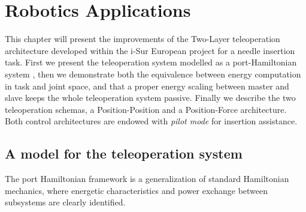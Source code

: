 \chapter{Robotics Applications}

This chapter will present the improvements of the Two-Layer teleoperation architecture developed within the i-Sur European project \cite{Ferraguti2015} for a needle insertion task.
First we present the teleoperation system modelled as a port-Hamiltonian system \cite{Ferraguti2015}, then we demonstrate both the equivalence between energy computation in task and joint space, and that a proper energy scaling between master and slave keeps the whole teleoperation system passive.
Finally we describe the two teleoperation schemas, a Position-Position and a Position-Force architecture. Both control architectures are endowed with \textit{pilot mode} for insertion assistance.

\section{A model for the teleoperation system}
The port Hamiltonian framework is a generalization of standard Hamiltonian mechanics, where energetic characteristics and power exchange between subsystems are clearly identified.
